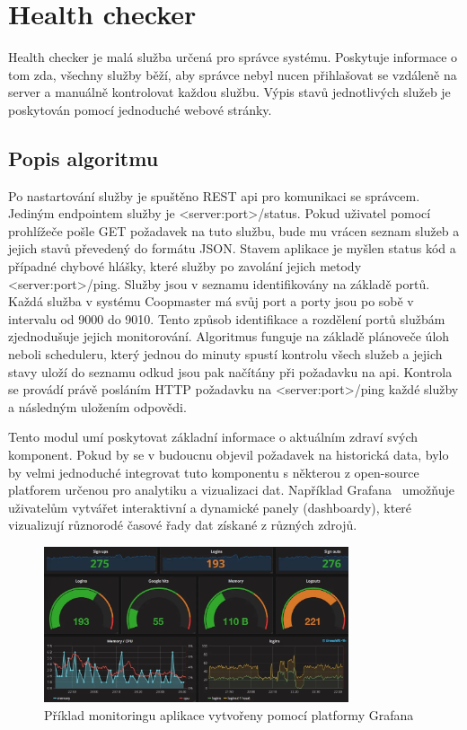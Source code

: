 \section{Health checker}\label{sec:health-checker}
Health checker je malá služba určená pro správce systému.
Poskytuje informace o tom zda, všechny služby běží, aby správce nebyl nucen přihlašovat se vzdáleně na server a manuálně kontrolovat každou službu.
Výpis stavů jednotlivých služeb je poskytován pomocí jednoduché webové stránky.

\subsection*{Popis algoritmu}
Po nastartování služby je spuštěno REST api pro komunikaci se správcem.
Jediným endpointem služby je <server:port>/status.
Pokud uživatel pomocí prohlížeče pošle GET požadavek na tuto službu, bude mu vrácen seznam služeb a jejich stavů převedený do formátu JSON.
Stavem aplikace je myšlen status kód a případné chybové hlášky, které služby po zavolání jejich metody <server:port>/ping.
Služby jsou v seznamu identifikovány na základě portů.
Každá služba v systému Coopmaster má svůj port a porty jsou po sobě v intervalu od 9000 do 9010.
Tento způsob identifikace a rozdělení portů službám zjednodušuje jejich monitorování.
Algoritmus funguje na základě plánoveče úloh neboli scheduleru, který jednou do minuty spustí kontrolu všech služeb a jejich stavy uloží do seznamu odkud jsou pak načítány při požadavku na api.
Kontrola se provádí právě posláním HTTP požadavku na <server:port>/ping každé služby a následným uložením odpovědi.

Tento modul umí poskytovat základní informace o aktuálním zdraví svých komponent.
Pokud by se v budoucnu objevil požadavek na historická data, bylo by velmi jednoduché integrovat tuto komponentu s některou z open-source platforem určenou pro analytiku a vizualizaci dat.
Například Grafana~\cite{grafana} umožňuje uživatelům vytvářet interaktivní a dynamické panely (dashboardy), které vizualizují různorodé časové řady dat získané z různých zdrojů.


\begin{figure}[h]
    \centering
    \includegraphics[width=0.8\textwidth]{img/health-checker-grafana-dashboard}
    \caption{Příklad monitoringu aplikace vytvořeny pomocí platformy Grafana}
    \label{fig:health-checker-grafana-dashboard}
\end{figure}



